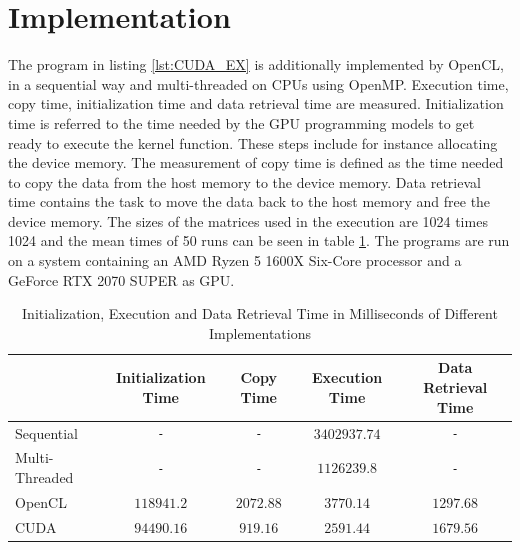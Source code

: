 \section{Implementation}
The program in listing \ref{lst:CUDA_EX} is additionally implemented by OpenCL, in a sequential way and multi-threaded on CPUs using OpenMP.
Execution time, copy time, initialization time and data retrieval time are measured.
Initialization time is referred to the time needed by the GPU programming models to get ready to execute the kernel function.
These steps include for instance allocating the device memory.
The measurement of copy time is defined as the time needed to copy the data from the host memory to the device memory.
Data retrieval time contains the task to move the data back to the host memory and free the device memory.
The sizes of the matrices used in the execution are 1024 times 1024 and the mean times of 50 runs can be seen in table \ref{tab:time}.
The programs are run on a system containing an AMD Ryzen 5 1600X Six-Core processor and a GeForce RTX 2070 SUPER as GPU.
\begin{table}[htbp]
  \centering
  \begin{tabular}{|l|c|c|c|c|}
	\hline
	  & Initialization Time & Copy Time & Execution Time & Data Retrieval Time \\\hline
	  Sequential & \texttt{-} & \texttt{-} & \(3402937.74\) & \texttt{-} \\\hline
	  Multi-Threaded & \texttt{-}& \texttt{-} & \(1126239.8\) & \texttt{-} \\\hline
	  OpenCL & \(118941.2\) & \(2072.88\) & \(3770.14\) & \(1297.68\) \\\hline
	  CUDA & \(94490.16\) & \(919.16\) & \(2591.44\) & \(1679.56\) \\\hline
  \end{tabular}
    \caption{Initialization, Execution and Data Retrieval Time in Milliseconds of Different Implementations}
  \label{tab:time}
\end{table}


